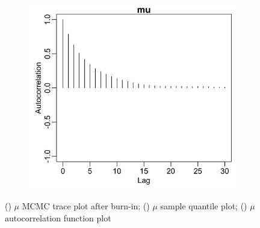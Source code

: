 \documentclass{uwstat572}
\begin{document}
\begin{figure}[H]
\begin{subfigure}[b]{0.49\textwidth}
		\caption{}
		\label{fig:quant_mu}
	\end{subfigure}
	\hfill
	\begin{subfigure}[b]{0.49\textwidth}
		\includegraphics[width=\textwidth]{figures/mcmc_acf_plot_mu.png}
		\caption{}
		\label{fig:acf_mu}
	\end{subfigure}
	\caption{() $\mu$ MCMC trace plot after burn-in; () $\mu$ sample quantile plot; () $\mu$ autocorrelation function plot }
	\label{fig:diagnostics_mu}
\end{figure} 
\end{document}

